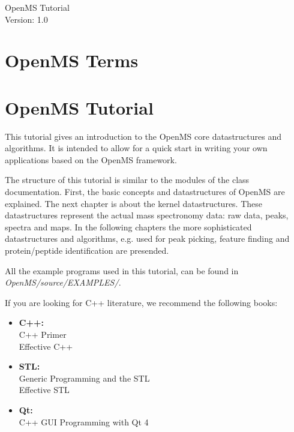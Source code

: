 \documentclass[a4paper]{article}
\begin{document}
\begin{titlepage}
\vspace*{7cm}
\begin{center}
{\Large OpenMS Tutorial\\[1ex]\large Version: 1.0 }\\
\end{center}
\end{titlepage}


\setcounter{tocdepth}{2}
\tableofcontents
\pagebreak

\section{OpenMS Terms}
	
	
	\pagebreak

\section{OpenMS Tutorial}

	This tutorial gives an introduction to the OpenMS core datastructures and algorithms.
	It is intended to allow for a quick start in writing your own applications based on
	the OpenMS framework.
	
	The structure of this tutorial is similar to the modules of the class documentation.
	First, the basic concepts and datastructures of OpenMS are explained. The next chapter is
	about the kernel datastructures. These datastructures represent the actual mass spectronomy
	data: raw data, peaks, spectra and maps. In the following chapters the more sophisticated 
	datastructures and algorithms, e.g. used for peak picking, feature finding and protein/peptide 
	identification are presended.
	
	All the example programs used in this tutorial, can be found in {\em OpenMS/source/EXAMPLES/}.

	If you are looking for C++ literature, we recommend the following books:
	\begin{itemize}
		\item {\bf C++:}\\ C++ Primer\\ Effective C++
		\item {\bf STL:}\\ Generic Programming and the STL\\ Effective STL
		\item {\bf Qt:}\\ C++ GUI Programming with Qt 4
	\end{itemize}
	
	\pagebreak
	
	\pagebreak
	
	\pagebreak
	
	\pagebreak
	
	\pagebreak
	
	\pagebreak
	
	\pagebreak
	
	\pagebreak
	
	\pagebreak
	
	\pagebreak
	
	\pagebreak
	
\end{document}
